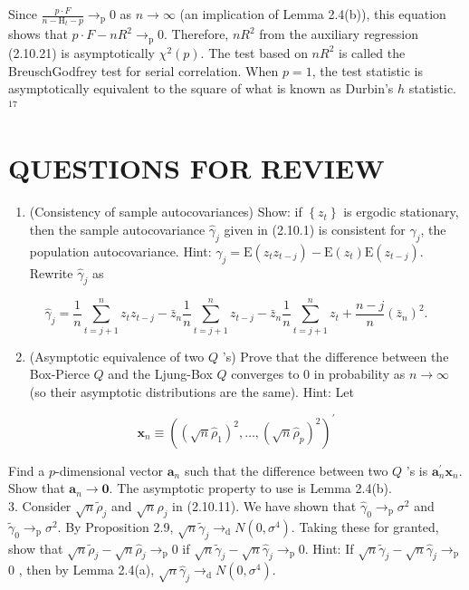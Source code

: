 \documentclass[10pt]{article}
\begin{document}
Since $\frac{p \cdot F}{n-\mathrm{H}_{t}-p} \rightarrow_{\mathrm{p}} 0$ as $n \rightarrow \infty$ (an implication of Lemma 2.4(b)), this equation shows that $p \cdot F-n R^{2} \rightarrow_{\mathrm{p}} 0$. Therefore, $n R^{2}$ from the auxiliary regression (2.10.21) is asymptotically $\chi^{2}(p)$. The test based on $n R^{2}$ is called the BreuschGodfrey test for serial correlation. When $p=1$, the test statistic is asymptotically equivalent to the square of what is known as Durbin's $h$ statistic. ${ }^{17}$

\section*{QUESTIONS FOR REVIEW}
\begin{enumerate}
  \item (Consistency of sample autocovariances) Show: if $\left\{z_{t}\right\}$ is ergodic stationary, then the sample autocovariance $\hat{\gamma}_{j}$ given in (2.10.1) is consistent for $\gamma_{j}$, the population autocovariance. Hint: $\gamma_{j}=\mathrm{E}\left(z_{t} z_{t-j}\right)-\mathrm{E}\left(z_{t}\right) \mathrm{E}\left(z_{t-j}\right)$. Rewrite $\hat{\gamma}_{j}$ as
\end{enumerate}

$$
\hat{\gamma}_{j}=\frac{1}{n} \sum_{t=j+1}^{n} z_{t} z_{t-j}-\bar{z}_{n} \frac{1}{n} \sum_{t=j+1}^{n} z_{t-j}-\bar{z}_{n} \frac{1}{n} \sum_{t=j+1}^{n} z_{t}+\frac{n-j}{n}\left(\bar{z}_{n}\right)^{2} .
$$

\begin{enumerate}
  \setcounter{enumi}{1}
  \item (Asymptotic equivalence of two $Q$ 's) Prove that the difference between the Box-Pierce $Q$ and the Ljung-Box $Q$ converges to 0 in probability as $n \rightarrow \infty$ (so their asymptotic distributions are the same). Hint: Let
\end{enumerate}

$$
\mathbf{x}_{n} \equiv\left(\left(\sqrt{n} \hat{\rho}_{1}\right)^{2}, \ldots,\left(\sqrt{n} \hat{\rho}_{p}\right)^{2}\right)^{\prime}
$$

Find a $p$-dimensional vector $\mathbf{a}_{n}$ such that the difference between two $Q$ 's is $\mathbf{a}_{n}^{\prime} \mathbf{x}_{n}$. Show that $\mathbf{a}_{n} \rightarrow \mathbf{0}$. The asymptotic property to use is Lemma 2.4(b).\\
3. Consider $\sqrt{n} \tilde{\rho}_{j}$ and $\sqrt{n} \hat{\rho}_{j}$ in (2.10.11). We have shown that $\hat{\gamma}_{0} \rightarrow_{\mathrm{p}} \sigma^{2}$ and $\tilde{\gamma}_{0} \rightarrow_{\mathrm{p}} \sigma^{2}$. By Proposition 2.9, $\sqrt{n} \tilde{\gamma}_{j} \rightarrow_{\mathrm{d}} N\left(0, \sigma^{4}\right)$. Taking these for granted, show that $\sqrt{n} \tilde{\rho}_{j}-\sqrt{n} \hat{\rho}_{j} \rightarrow_{\mathrm{p}} 0$ if $\sqrt{n} \tilde{\gamma}_{j}-\sqrt{n} \hat{\gamma}_{j} \rightarrow_{\mathrm{p}} 0$. Hint: If $\sqrt{n} \tilde{\gamma}_{j}-\sqrt{n} \hat{\gamma}_{j} \rightarrow_{\mathrm{p}}$ 0 , then by Lemma 2.4(a), $\sqrt{n} \hat{\gamma}_{j} \rightarrow_{\mathrm{d}} N\left(0, \sigma^{4}\right)$.
\end{document}
